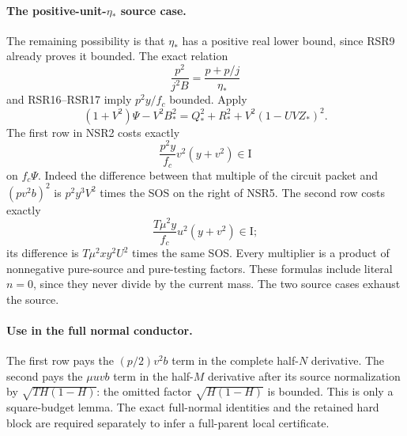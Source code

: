 \paragraph{The positive-unit-$\eta_*$ source case.}
The remaining possibility is that $\eta_*$ has a positive real lower
bound, since RSR9 already proves it bounded. The exact relation
\[
 \frac{p^2}{j^2B}=\frac{p+p/j}{\eta_*}
\]
and RSR16--RSR17 imply $p^2y/f_c$ bounded. Apply
\[
 (1+V^2)\Psi-V^2B_*^2
       =Q_*^2+R_*^2+V^2(1-UVZ_*)^2.
 \tag{NSR5}
\]
The first row in NSR2 costs exactly
\[
 \frac{p^2y}{f_c}v^2(y+v^2)\in\mathrm I
\]
on $f_c\Psi$. Indeed the difference between that multiple of the
circuit packet and $(pv^2b)^2$ is $p^2y^3V^2$ times the SOS on
the right of NSR5. The second row costs exactly
\[
 \frac{T\mu^2y}{f_c}u^2(y+v^2)\in\mathrm I;
\]
its difference is $T\mu^2xy^2U^2$ times the same SOS. Every
multiplier is a product of nonnegative pure-source and pure-testing
factors. These formulas include literal $n=0$, since they never
divide by the current mass. The two source cases exhaust the source.

\paragraph{Use in the full normal conductor.}
The first row pays the $(p/2)v^2b$ term in the complete half-$N$
derivative. The second pays the $\mu uvb$ term in the half-$M$
derivative after its source normalization by
$\sqrt{TH(1-H)}$: the omitted factor $\sqrt{H(1-H)}$ is bounded.
This is only a square-budget lemma. The exact full-normal identities
and the retained hard block are required separately to infer a
full-parent local certificate.
